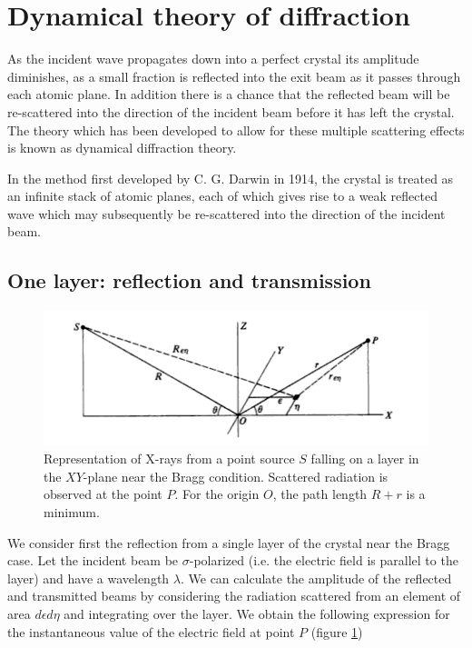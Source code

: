 \documentclass[12pt,oneside,notitlepage,abstracton,a4paper]{scrartcl}
\begin{document}
\section{Dynamical theory of diffraction}
As the incident wave propagates down into a perfect crystal its amplitude diminishes, as a small fraction is reflected into the exit beam as it passes through each atomic plane. In addition there is a chance that the reflected beam will be re-scattered into the direction of the incident beam before it has left the crystal. The theory which has been developed to allow for these multiple scattering effects is known as dynamical diffraction theory.

In the method first developed by C. G. Darwin in 1914, the crystal is treated as an infinite stack of atomic planes, each of which gives rise to a weak reflected wave which may subsequently be re-scattered into the direction of the incident beam.


\subsection{One layer: reflection and transmission}\label{onelayer}

\begin{figure}[h]
\begin{center}
\includegraphics[width=12cm]{pics/picture1.png}
\vspace{-10pt}
\caption{Representation of X-rays from a point source $S$ falling on a layer in the $XY$-plane near the Bragg condition. Scattered radiation is observed at the point $P$. For the origin $O$, the path length $R+r$ is a minimum.}
\label{pic1}
\vspace{-10pt}
\end{center}
\end{figure}

We consider first the reflection from a single layer of the crystal near the Bragg case. Let the incident beam be $\sigma$-polarized (i.e. the electric field is parallel to the layer) and have a wavelength $\lambda$. We can calculate the amplitude of the reflected and transmitted beams by considering the radiation scattered from an element of area $d\epsilon d\eta$ and integrating over the layer. We obtain the following expression for the instantaneous value of the electric field at point $P$ (figure \ref{pic1})
\end{document}
